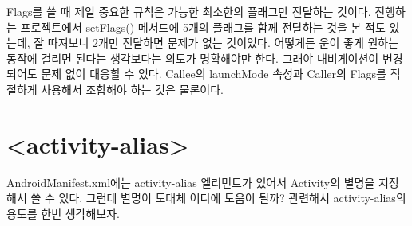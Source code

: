 Flags를 쓸 때 제일 중요한 규칙은 가능한 최소한의 플래그만 전달하는 것이다.
진행하는 프로젝트에서 setFlags() 메서드에 5개의 플래그를 함께 전달하는 것을 본 적도 있는데, 잘 따져보니 2개만 전달하면 문제가 없는 것이었다.
어떻게든 운이 좋게 원하는 동작에 걸리면 된다는 생각보다는 의도가 명확해야만 한다. 그래야 내비게이션이 변경되어도 문제 없이 대응할 수 있다. 
Callee의 launchMode 속성과 Caller의 Flags를 적절하게 사용해서 조합해야 하는 것은 물론이다. 

\section{<activity-alias>}\label{sec:alias}
AndroidManifest.xml에는 activity-alias 엘리먼트가 있어서 Activity의 별명을 지정해서 쓸 수 있다. 그런데 별명이 도대체 어디에 도움이 될까?
관련해서 activity-alias의 용도를 한번 생각해보자.

